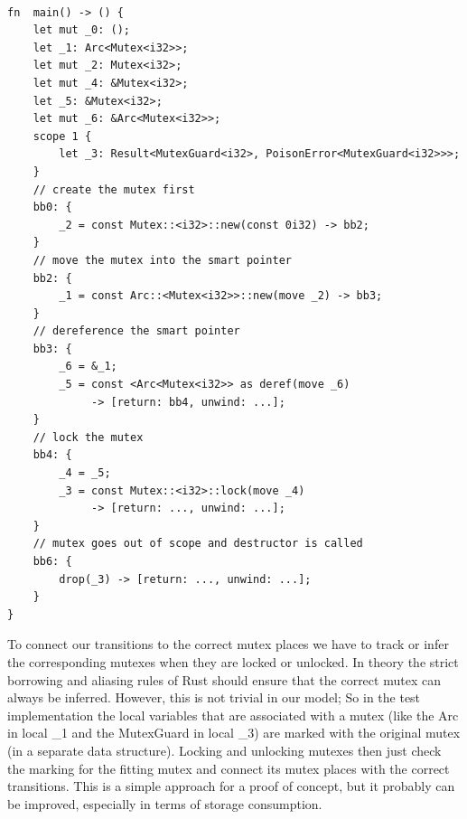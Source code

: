 \begin{lstlisting}

fn  main() -> () {
    let mut _0: ();
    let _1: Arc<Mutex<i32>>;
    let mut _2: Mutex<i32>;
    let mut _4: &Mutex<i32>;
    let _5: &Mutex<i32>;
    let mut _6: &Arc<Mutex<i32>>;
    scope 1 {
        let _3: Result<MutexGuard<i32>, PoisonError<MutexGuard<i32>>>; 
    }
    // create the mutex first
    bb0: {
        _2 = const Mutex::<i32>::new(const 0i32) -> bb2; 
    }
    // move the mutex into the smart pointer
    bb2: {
        _1 = const Arc::<Mutex<i32>>::new(move _2) -> bb3; 
    }
    // dereference the smart pointer
    bb3: {
        _6 = &_1;                        
        _5 = const <Arc<Mutex<i32>> as deref(move _6) 
             -> [return: bb4, unwind: ...]; 
    }
    // lock the mutex
    bb4: {
        _4 = _5;                         
        _3 = const Mutex::<i32>::lock(move _4) 
             -> [return: ..., unwind: ...]; 
    }
    // mutex goes out of scope and destructor is called
    bb6: {
        drop(_3) -> [return: ..., unwind: ...];
    }
}
\end{lstlisting}

To connect our transitions to the correct mutex places we have to track or infer the corresponding mutexes when they are locked or unlocked.
In theory the strict borrowing and aliasing rules of Rust should ensure that the correct mutex can always be inferred.
However, this is not trivial in our model; So in the test implementation the local variables that are associated with a mutex (like the Arc in local \_1 and the MutexGuard in local \_3) are marked with the original mutex (in a separate data structure).
Locking and unlocking mutexes then just check the marking for the fitting mutex and connect its mutex places with the correct transitions.
This is a simple approach for a proof of concept, but it probably can be improved, especially in terms of storage consumption.

